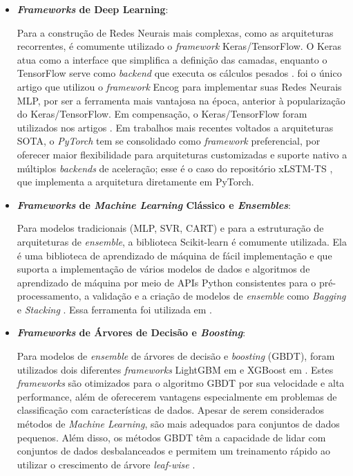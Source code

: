 \begin{itemize}
    \item \textbf{\textit{Frameworks} de Deep Learning}: 
    
    Para a construção de Redes Neurais mais complexas, como as arquiteturas recorrentes, é comumente utilizado o \textit{framework} Keras/TensorFlow. O Keras atua como a interface que simplifica a definição das camadas, enquanto o TensorFlow serve como \textit{backend} que executa os cálculos pesados \cite{site6}.  foi o único artigo que utilizou o \textit{framework} Encog para implementar suas Redes Neurais MLP, por ser a ferramenta mais vantajosa na época, anterior à popularização do Keras/TensorFlow. Em compensação, o Keras/TensorFlow foram utilizados nos artigos . Em trabalhos mais recentes voltados a arquiteturas SOTA, o \textit{PyTorch} tem se consolidado como \textit{framework} preferencial, por oferecer maior flexibilidade para arquiteturas customizadas e suporte nativo a múltiplos \textit{backends} de aceleração; esse é o caso do repositório xLSTM-TS , que implementa a arquitetura diretamente em PyTorch.

    \item \textbf{\textit{Frameworks} de \textit{Machine Learning} Clássico e \textit{Ensembles}}: 

    Para modelos tradicionais (MLP, SVR, CART) e para a estruturação de arquiteturas de \textit{ensemble}, a biblioteca Scikit-learn é comumente utilizada. Ela é uma biblioteca de aprendizado de máquina de fácil implementação e que suporta a implementação de vários modelos de dados e algoritmos de aprendizado de máquina por meio de APIs Python consistentes para o pré-processamento, a validação e a criação de modelos de \textit{ensemble} como \textit{Bagging} e \textit{Stacking} \cite{site7}. Essa ferramenta foi utilizada em .

    \item \textbf{\textit{Frameworks} de Árvores de Decisão e \textit{Boosting}}: 

    Para modelos de \textit{ensemble} de árvores de decisão e \textit{boosting} (GBDT), foram utilizados dois diferentes \textit{frameworks} LightGBM em  e XGBoost em . Estes \textit{frameworks} são otimizados para o algoritmo GBDT por sua velocidade e alta performance, além de oferecerem vantagens especialmente em problemas de classificação com características de dados. Apesar de serem considerados métodos de \textit{Machine Learning}, são mais adequados para conjuntos de dados pequenos. Além disso, os métodos GBDT têm a capacidade de lidar com conjuntos de dados desbalanceados e permitem um treinamento rápido ao utilizar o crescimento de árvore \textit{leaf-wise} \cite{Benhamou2021XAIPlanning}.
    
\end{itemize}

